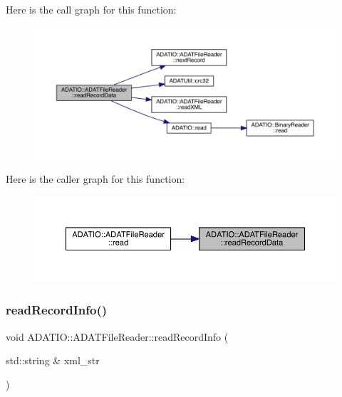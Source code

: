 Here is the call graph for this function\+:
\nopagebreak
\begin{figure}[H]
\begin{center}
\leavevmode
\includegraphics[width=350pt]{db/de5/group__qio_ga525c9902a7ee7ebe41c688897da0652e_cgraph}
\end{center}
\end{figure}
Here is the caller graph for this function\+:
\nopagebreak
\begin{figure}[H]
\begin{center}
\leavevmode
\includegraphics[width=350pt]{db/de5/group__qio_ga525c9902a7ee7ebe41c688897da0652e_icgraph}
\end{center}
\end{figure}
\mbox{\label{group__qio_gade5b9d659e34ec9c9de267858a675d7d}} 
\subsubsection{\texorpdfstring{readRecordInfo()}{readRecordInfo()}\hspace{0.1cm}{\footnotesize\ttfamily [1/2]}}
{\footnotesize\ttfamily void A\+D\+A\+T\+I\+O\+::\+A\+D\+A\+T\+File\+Reader\+::read\+Record\+Info (\begin{DoxyParamCaption}\item[{std\+::string \&}]{xml\+\_\+str }\end{DoxyParamCaption})\hspace{0.3cm}{\ttfamily [protected]}}



